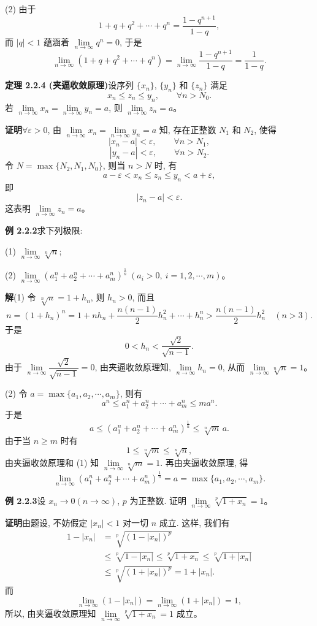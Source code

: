 \documentclass[UTF8, 12pt, fontset=fandol, oneside]{ctexart}
\begin{document}
(2) 由于
\[
  1+q+q^2+\cdots+q^n=\frac{1-q^{n+1}}{1-q},
\]
而 $|q|<1$ 蕴涵着 $\lim\limits_{n\to\infty}q^n=0$, 于是
\[
  \lim_{n\to\infty}(1+q+q^2+\cdots+q^n)
  =
  \lim_{n\to\infty}\frac{1-q^{n+1}}{1-q}
  =
  \frac1{1-q}.
\]

\noindent\textbf{定理 2.2.4 (夹逼收敛原理)}\quad 设序列 $\{x_n\}$, $\{y_n\}$ 和 $\{z_n\}$ 满足
\[
  x_n\leqslant z_n\leqslant y_n,\qquad \forall n>N_0.
\]
若 $\lim\limits_{n\to\infty}x_n=\lim\limits_{n\to\infty}y_n=a$, 则 $\lim\limits_{n\to\infty}z_n=a$。

\noindent\textbf{证明}\quad $\forall\varepsilon>0$, 由 $\lim\limits_{n\to\infty}x_n=\lim\limits_{n\to\infty}y_n=a$ 知, 存在正整数 $N_1$ 和 $N_2$, 使得
\[
  |x_n-a|<\varepsilon,\qquad \forall n>N_1,
\]
\[
  |y_n-a|<\varepsilon,\qquad \forall n>N_2.
\]
令 $N=\max\{N_2,N_1,N_0\}$, 则当 $n>N$ 时, 有
\[
  a-\varepsilon<x_n\leqslant z_n\leqslant y_n<a+\varepsilon,
\]
即
\[
  |z_n-a|<\varepsilon.
\]
这表明 $\lim\limits_{n\to\infty}z_n=a$。

\noindent\textbf{例 2.2.2}\quad 求下列极限:

(1) $\lim\limits_{n\to\infty}\sqrt[n]{n}$;

(2) $\lim\limits_{n\to\infty}(a_1^n+a_2^n+\cdots+a_m^n)^{\frac1n}\ (a_i>0,\ i=1,2,\cdots,m)$。

\noindent\textbf{解}\quad (1) 令 $\sqrt[n]{n}=1+h_n$, 则 $h_n>0$, 而且
\[
  n=(1+h_n)^n
  =
  1+nh_n+\frac{n(n-1)}2h_n^2+\cdots+h_n^n
  >
  \frac{n(n-1)}2h_n^2\quad(n>3).
\]
于是
\[
  0<h_n<\frac{\sqrt2}{\sqrt{n-1}}.
\]
由于 $\lim\limits_{n\to\infty}\dfrac{\sqrt2}{\sqrt{n-1}}=0$, 由夹逼收敛原理知, $\lim\limits_{n\to\infty}h_n=0$, 从而 $\lim\limits_{n\to\infty}\sqrt[n]{n}=1$。

(2) 令 $a=\max\{a_1,a_2,\cdots,a_m\}$, 则有
\[
  a^n\leqslant a_1^n+a_2^n+\cdots+a_m^n\leqslant ma^n.
\]
于是
\[
  a\leqslant (a_1^n+a_2^n+\cdots+a_m^n)^{\frac1n}\leqslant \sqrt[n]{m}\,a.
\]
由于当 $n\geqslant m$ 时有
\[
  1\leqslant\sqrt[n]{m}\leqslant\sqrt[n]{n},
\]
由夹逼收敛原理和 (1) 知 $\lim\limits_{n\to\infty}\sqrt[n]{m}=1$. 再由夹逼收敛原理, 得
\[
  \lim_{n\to\infty}(a_1^n+a_2^n+\cdots+a_m^n)^{\frac1n}
  =
  a
  =
  \max\{a_1,a_2,\cdots,a_m\}.
\]

\noindent\textbf{例 2.2.3}\quad 设 $x_n\to0(n\to\infty)$, $p$ 为正整数. 证明 $\lim\limits_{n\to\infty}\sqrt[p]{1+x_n}=1$。

\noindent\textbf{证明}\quad 由题设, 不妨假定 $|x_n|<1$ 对一切 $n$ 成立. 这样, 我们有
\[
\begin{aligned}
  1-|x_n|
  &=\sqrt[p]{(1-|x_n|)^p}\\
  &\leqslant \sqrt[p]{1-|x_n|}
   \leqslant \sqrt[p]{1+x_n}
   \leqslant \sqrt[p]{1+|x_n|}\\
  &\leqslant \sqrt[p]{(1+|x_n|)^p}
  =1+|x_n|.
\end{aligned}
\]
而
\[
  \lim_{n\to\infty}(1-|x_n|)
  =
  \lim_{n\to\infty}(1+|x_n|)
  =
  1,
\]
所以, 由夹逼收敛原理知 $\lim\limits_{n\to\infty}\sqrt[p]{1+x_n}=1$ 成立。
\end{document}
